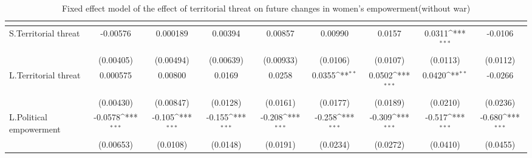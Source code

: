 \begin{table}[htbp]\centering
\def\sym#1{\ifmmode^{#1}\else\(^{#1}\)\fi}
\caption{Fixed effect model of the effect of territorial threat on future changes in women's empowerment(without war) \label{fepolempnowar}}
\begin{tabular}{l*{8}{c}}
\hline\hline
                    &&&&&&&&\\
\hline
S.Territorial threat&    -0.00576         &    0.000189         &     0.00394         &     0.00857         &     0.00990         &      0.0157         &      0.0311\sym{***}&     -0.0106         \\
                    &   (0.00405)         &   (0.00494)         &   (0.00639)         &   (0.00933)         &    (0.0106)         &    (0.0107)         &    (0.0113)         &    (0.0112)         \\
[1em]
L.Territorial threat&    0.000575         &     0.00800         &      0.0169         &      0.0258         &      0.0355\sym{**} &      0.0502\sym{***}&      0.0420\sym{**} &     -0.0266         \\
                    &   (0.00430)         &   (0.00847)         &    (0.0128)         &    (0.0161)         &    (0.0177)         &    (0.0189)         &    (0.0210)         &    (0.0236)         \\
[1em]
L.Political empowerment&     -0.0578\sym{***}&      -0.105\sym{***}&      -0.155\sym{***}&      -0.208\sym{***}&      -0.258\sym{***}&      -0.309\sym{***}&      -0.517\sym{***}&      -0.680\sym{***}\\
                    &   (0.00653)         &    (0.0108)         &    (0.0148)         &    (0.0191)         &    (0.0234)         &    (0.0272)         &    (0.0410)         &    (0.0455)         \\
[1em]

\end{tabular}
\end{table}
